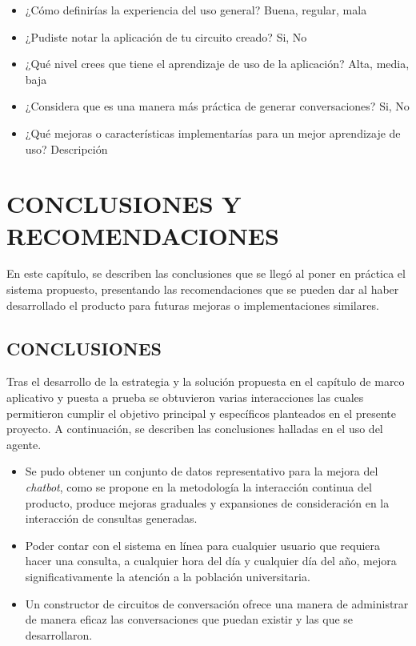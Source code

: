 \documentclass[letter, openright, 12pt]{book}
\begin{document}
{\begin{itemize}
\item ¿Cómo definirías la experiencia del uso general? Buena, regular, mala
\item ¿Pudiste notar la aplicación de tu circuito creado? Si, No
\item ¿Qué nivel crees que tiene el aprendizaje de uso de la aplicación? Alta, media, baja
\item ¿Considera que es una manera más práctica de generar conversaciones? Si, No
\item ¿Qué mejoras o características implementarías para un mejor aprendizaje de uso? Descripción
\end{itemize}


\chapter{CONCLUSIONES Y RECOMENDACIONES}
En este capítulo, se describen las conclusiones que se llegó al poner en práctica el sistema propuesto, presentando las recomendaciones que se pueden dar al haber desarrollado el producto para futuras mejoras o implementaciones similares.

\section{CONCLUSIONES}
Tras el desarrollo de la estrategia y la solución propuesta en el capítulo de marco aplicativo y puesta a prueba se obtuvieron varias interacciones las cuales permitieron cumplir el objetivo principal y específicos planteados en el presente proyecto. A continuación, se describen las conclusiones halladas en el uso del agente.
\begin{itemize}
\item Se pudo obtener un conjunto de datos representativo para la mejora del \textit{chatbot}, como se propone en la metodología la interacción continua del producto, produce mejoras graduales y expansiones de consideración en la interacción de consultas generadas.
\item Poder contar con el sistema en línea para cualquier usuario que requiera hacer una consulta, a cualquier hora del día y cualquier día del año, mejora significativamente la atención a la población universitaria.
\item Un constructor de circuitos de conversación ofrece una manera de administrar de manera eficaz las conversaciones que puedan existir y las que se desarrollaron. 
\end{itemize}

}
\end{document}
